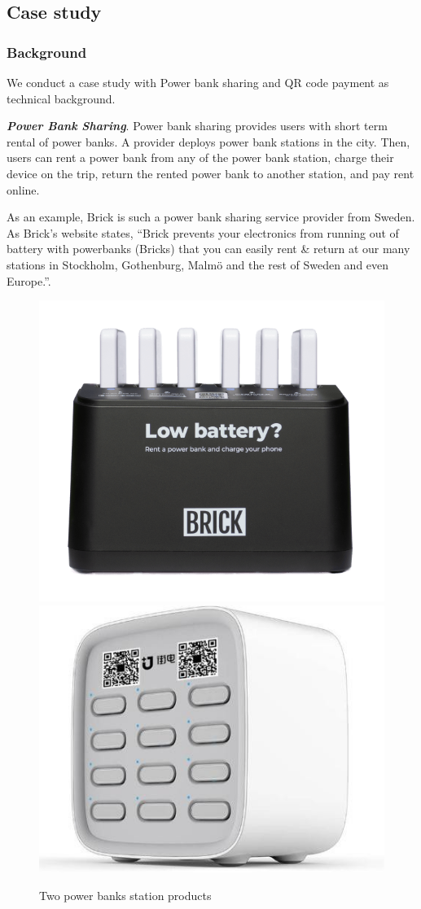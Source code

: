 \subsection{Case study}

\subsubsection{Background}

We conduct a case study with Power bank sharing and QR code payment as technical background.

\textbf{\textit{Power Bank Sharing}}. 
Power bank sharing provides users with short term rental of power banks. A provider deploys power bank stations in the city. Then, users can rent a power bank from any of the power bank station, charge their device on the trip, return the rented power bank to another station, and pay rent online.

As an example, Brick is such a power bank sharing service provider from Sweden. As Brick's website states, ``Brick prevents your electronics from running out of battery with powerbanks (Bricks) that you can easily rent \& return at our many stations in Stockholm, Gothenburg, Malmö and the rest of Sweden and even Europe.''. 


\begin{figure}[hbtp]
	\centering
	\includegraphics[width=.4 \linewidth]{./Figs/Brick_station.png}
	\includegraphics[width=.4 \linewidth]{./Figs/jiedian.jpg}
	\caption{Two power banks station products}
	\label{fig:PBS_products}
\end{figure}

